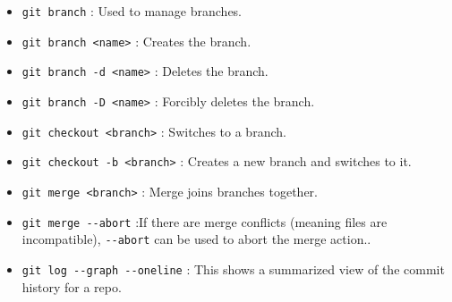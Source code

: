 	\begin{itemize}
		\item \verb|git branch| : Used to manage branches.

		\item \verb|git branch <name>| : Creates the branch.
		
		\item \verb|git branch -d <name>| : Deletes the branch.

		\item \verb|git branch -D <name>| : Forcibly deletes the branch.

		\item \verb|git checkout <branch>| : Switches to a branch.

		\item \verb|git checkout -b <branch>| : Creates a new branch and switches to it.
		
		\item \verb|git merge <branch>| : Merge joins branches together.
		
		\item \verb|git merge --abort| :If there are merge conflicts (meaning files are incompatible), \verb|--abort| can be used to abort the merge action..
		
		\item \verb|git log --graph --oneline| : This shows a summarized view of the commit history for a repo.
	\end{itemize}	



